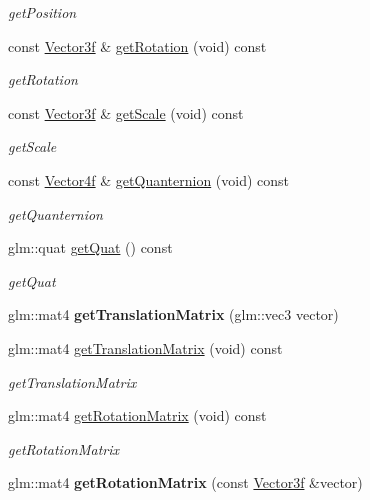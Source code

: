 \begin{DoxyCompactItemize}
\begin{DoxyCompactList}\small\item\em get\+Position \end{DoxyCompactList}\item 
const \hyperlink{classVector3}{Vector3f} \& \hyperlink{classEngine_1_1Position_aa13ac4ee93439ff53585b719be6b4066}{get\+Rotation} (void) const 
\begin{DoxyCompactList}\small\item\em get\+Rotation \end{DoxyCompactList}\item 
const \hyperlink{classVector3}{Vector3f} \& \hyperlink{classEngine_1_1Position_a11cd4d028d14646d067437cfd087b057}{get\+Scale} (void) const 
\begin{DoxyCompactList}\small\item\em get\+Scale \end{DoxyCompactList}\item 
const \hyperlink{classVector4}{Vector4f} \& \hyperlink{classEngine_1_1Position_a2d7b2153822522b82221b7fb470fad73}{get\+Quanternion} (void) const 
\begin{DoxyCompactList}\small\item\em get\+Quanternion \end{DoxyCompactList}\item 
glm\+::quat \hyperlink{classEngine_1_1Position_a4dabca5c3401e511e79bb305fecabb5e}{get\+Quat} () const 
\begin{DoxyCompactList}\small\item\em get\+Quat \end{DoxyCompactList}\item 
\hypertarget{classEngine_1_1Position_a4fa18114d2f27699c90822e61a7fbbab}{}glm\+::mat4 {\bfseries get\+Translation\+Matrix} (glm\+::vec3 vector)\label{classEngine_1_1Position_a4fa18114d2f27699c90822e61a7fbbab}

\item 
glm\+::mat4 \hyperlink{classEngine_1_1Position_a1da72afb76b823fbe3036603c5c13daf}{get\+Translation\+Matrix} (void) const 
\begin{DoxyCompactList}\small\item\em get\+Translation\+Matrix \end{DoxyCompactList}\item 
glm\+::mat4 \hyperlink{classEngine_1_1Position_a9aaab620b558cfaa13549368fdfd25cf}{get\+Rotation\+Matrix} (void) const 
\begin{DoxyCompactList}\small\item\em get\+Rotation\+Matrix \end{DoxyCompactList}\item 
\hypertarget{classEngine_1_1Position_a2a1f69f40dd519292df5f2bb0be86a0a}{}glm\+::mat4 {\bfseries get\+Rotation\+Matrix} (const \hyperlink{classVector3}{Vector3f} \&vector)\label{classEngine_1_1Position_a2a1f69f40dd519292df5f2bb0be86a0a}


\end{DoxyCompactItemize}
